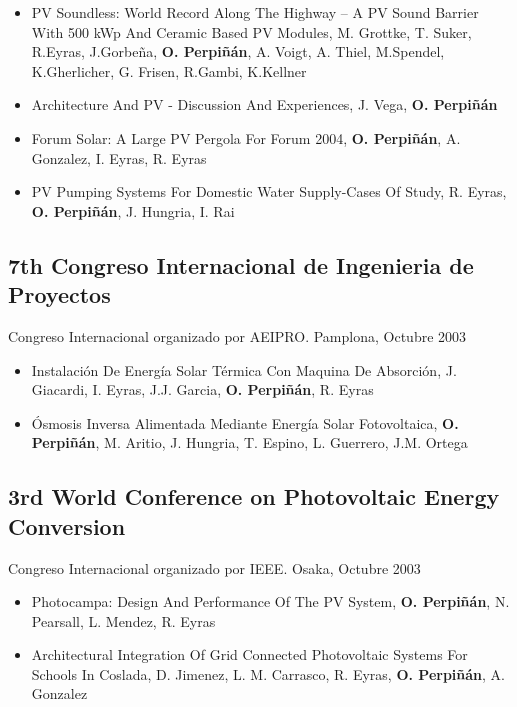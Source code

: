 \documentclass[article, a4paper]{memoir}
\begin{document}
\begin{itemize}
\item PV Soundless: World Record Along The Highway -- A PV Sound Barrier With 500 kWp And Ceramic Based PV Modules, M. Grottke, T. Suker, R.Eyras, J.Gorbeña, \textbf{O. Perpiñán}, A. Voigt, A.  Thiel, M.Spendel, K.Gherlicher, G. Frisen, R.Gambi, K.Kellner

\item Architecture And PV - Discussion And Experiences, J. Vega, \textbf{O. Perpiñán}

\item Forum Solar: A Large PV Pergola For Forum 2004, \textbf{O. Perpiñán}, A. Gonzalez, I. Eyras, R. Eyras

\item PV Pumping Systems For Domestic Water Supply-Cases Of Study, R. Eyras, \textbf{O. Perpiñán}, J. Hungria, I. Rai
\end{itemize}

\subsection{7th Congreso Internacional de Ingenieria de Proyectos}
\label{sec-9-13}
Congreso Internacional organizado por AEIPRO. Pamplona, Octubre 2003

\begin{itemize}
\item Instalación De Energía Solar Térmica Con Maquina De Absorción, J. Giacardi, I. Eyras, J.J. Garcia, \textbf{O. Perpiñán}, R. Eyras

\item Ósmosis Inversa Alimentada Mediante Energía Solar Fotovoltaica, \textbf{O. Perpiñán}, M. Aritio, J. Hungria, T. Espino, L. Guerrero, J.M. Ortega
\end{itemize}

\subsection{3rd World Conference on Photovoltaic Energy Conversion}
\label{sec-9-14}
Congreso Internacional organizado por IEEE. Osaka, Octubre 2003

\begin{itemize}
\item Photocampa: Design And Performance Of The PV System, \textbf{O. Perpiñán}, N. Pearsall, L. Mendez, R. Eyras

\item Architectural Integration Of Grid Connected Photovoltaic Systems For Schools In Coslada, D. Jimenez, L. M. Carrasco, R. Eyras, \textbf{O. Perpiñán}, A. Gonzalez
\end{itemize}
\end{document}
